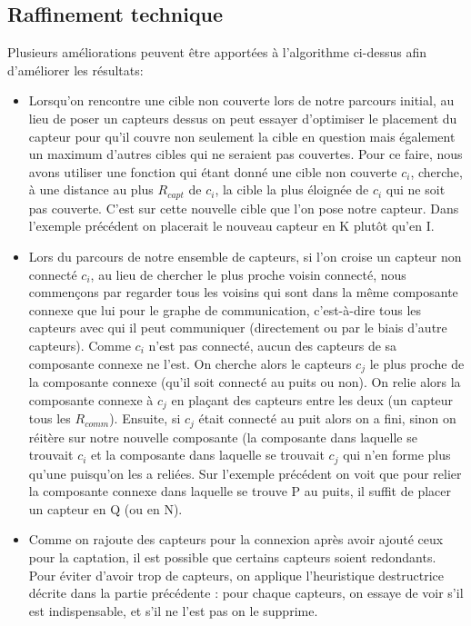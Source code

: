 \documentclass[12pt,a4paper]{article}
\begin{document}
\subsection{Raffinement technique}
Plusieurs améliorations peuvent être apportées à l'algorithme ci-dessus afin d'améliorer les résultats: 
\begin{itemize}
\item Lorsqu'on rencontre une cible non couverte lors de notre parcours initial, au lieu de poser un capteurs dessus on peut essayer d'optimiser le placement du capteur pour qu'il couvre non seulement la cible en question mais également un maximum d'autres cibles qui ne seraient pas couvertes. Pour ce faire, nous avons utiliser une fonction qui étant donné une cible non couverte $c_i$, cherche, à une distance au plus $R_{capt}$ de $c_i$, la cible la plus éloignée de $c_i$ qui ne soit pas couverte. C'est sur cette nouvelle cible que l'on pose notre capteur. Dans l'exemple précédent on placerait le nouveau capteur en K plutôt qu'en I.
\item Lors du parcours de notre ensemble de capteurs, si l'on croise un capteur non connecté $c_i$, au lieu de chercher le plus proche voisin connecté, nous commençons par regarder tous les voisins qui sont dans la même composante connexe que lui pour le graphe de communication, c'est-à-dire tous les capteurs avec qui il peut communiquer (directement ou par le biais d'autre capteurs). Comme $c_i$ n'est pas connecté, aucun des capteurs de sa composante connexe ne l'est. On cherche alors le capteurs $c_j$ le plus proche de la composante connexe (qu'il soit connecté au puits ou non). On relie alors la composante connexe à $c_j$ en plaçant des capteurs entre les deux (un capteur tous les $R_{comm}$). Ensuite, si $c_j$ était connecté au puit alors on a fini, sinon on réitère sur notre nouvelle composante (la composante dans laquelle se trouvait $c_i$ et la composante dans laquelle se trouvait $c_j$ qui n'en forme plus qu'une puisqu'on les a reliées. Sur l'exemple précédent on voit que pour relier la composante connexe dans laquelle se trouve P au puits, il suffit de placer un capteur en Q (ou en N).
\item Comme on rajoute des capteurs pour la connexion après avoir ajouté ceux pour la captation, il est possible que certains capteurs soient redondants. Pour éviter d'avoir trop de capteurs, on applique l'heuristique destructrice décrite dans la partie précédente : pour chaque capteurs, on essaye de voir s'il est indispensable, et s'il ne l'est pas on le supprime. 
\end{itemize}
\end{document}
